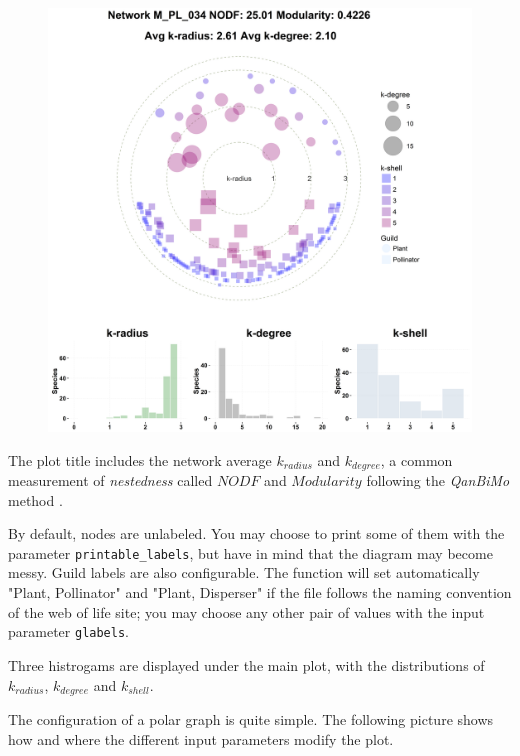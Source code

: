 \documentclass[12pt]{article}
\begin{document}
\begin{figure}[h!]
\centering
\includegraphics[scale=0.4]{M_PL_034_polar.png}
\label{fig:KMAN_red_example}
\end{figure}

The plot title includes the network average ${k}_{radius}$ and ${k}_{degree}$, a common measurement of \textit{nestedness} called $NODF$ \cite{almeida2008consistent} and $Modularity$ following the \textit{QanBiMo} method \cite{dormann2014method}.

By default, nodes are unlabeled. You may choose to print some of them with the parameter \texttt{printable\_labels}, but have in mind that the
diagram may become messy. Guild labels are also configurable. The function will set automatically "Plant, Pollinator" and "Plant, Disperser" if the
file follows the naming convention of the web of life site; you may choose any other pair of values with the input parameter \texttt{glabels}.

Three histrogams are displayed under the main plot, with the distributions of $k_{radius}$, $k_{degree}$ and $k_{shell}$. 

The configuration of a polar graph is quite simple. The following picture shows how and where the different input parameters modify the plot.
\end{document}

